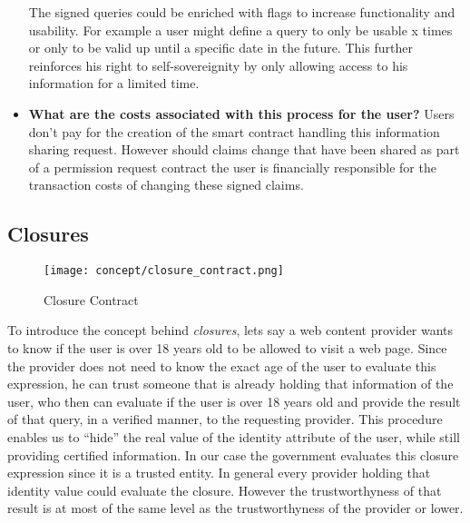 \begin{itemize}
The signed queries could be enriched with flags to increase functionality and usability. For example a user might define a query to only be usable x times or only to be valid up until a specific date in the future.
This further reinforces his right to self-sovereignity by only allowing access to his information for a limited time. 
\item \label{design_pecularity_four} \textbf{What are the costs associated with this process for the user?}
Users don't pay for the creation of the smart contract handling this information sharing request. However should claims change that have been shared as part of a permission request contract the user is financially responsible for the transaction costs of changing these signed claims.
\end{itemize}




\subsection{Closures}
\begin{figure}[ht]
\centering
\texttt{[image: concept/closure\_contract.png]}
\caption{Closure Contract}
\label{fig:closure}
\end{figure}

To introduce the concept behind \textit{closures}, lets say a web content provider wants to know if the user is over 18 years old to be allowed to visit a web page. Since the provider does not need to know the exact age of the user to evaluate this expression, he can trust someone that is already holding that information of the user, who then can evaluate if the user is over 18 years old and provide the result of that query, in a verified manner, to the requesting provider. This procedure enables us to “hide” the real value of the identity attribute of the user, while still providing certified information. In our case the government evaluates this closure expression since it is a trusted entity. In general every provider holding that identity value could evaluate the closure. However the trustworthyness of that result is at most of the same level as the trustworthyness of the provider or lower.

